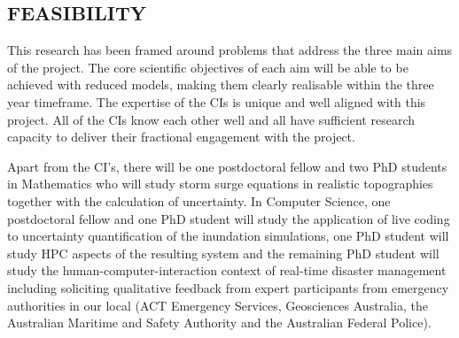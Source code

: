 \iffalse
\subsection*{RESEARCH ENVIRONMENT}
\fi

\subsection*{FEASIBILITY}

\iffalse The project is feasible due to the rigorous design with distinct tasks
and timelines which address the identified, well understood challenges
in this discipline. 
\fi

\iffalse
The project brings together a multi-disciplinary
team of experts in mathematics, software engineering, human computer interaction and high
performance computing.
\fi

This research has been framed around problems that address the three main aims of the project. The core scientific objectives of each aim will be able to be achieved with reduced models, making them clearly realisable within the three year timeframe.
The expertise of the CIs is unique and well aligned with this project. All of the CIs know each other well and all have sufficient research capacity to deliver their fractional engagement with the project.

Apart from the CI's, there will be one postdoctoral fellow and two PhD students in 
Mathematics who will study storm surge equations in realistic topographies together with the calculation of uncertainty. 
In Computer Science, one postdoctoral fellow and one PhD student will study the application of live coding to uncertainty quantification of the inundation simulations, one PhD student will study HPC aspects of the resulting system
and the remaining PhD student will study the human-computer-interaction context of real-time disaster management including soliciting qualitative feedback from expert participants from emergency authorities in our local (ACT Emergency
Services, Geosciences Australia, the Australian Maritime and Safety Authority and the Australian Federal Police).

